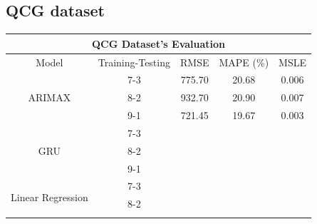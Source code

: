 \documentclass{ieeeojies}
\begin{document}
\subsection{QCG dataset} 

\begin{table}[H]
  \begin{tabular}{|ccccc|}
  \hline
  \multicolumn{5}{|c|}{\textbf{QCG Dataset's Evaluation}}                                                                                                                  \\ \hline
  \multicolumn{1}{|c|}{Model}                              & \multicolumn{1}{c|}{Training-Testing} & \multicolumn{1}{c|}{RMSE}    & \multicolumn{1}{c|}{MAPE (\%)} & MSLE  \\ \hline
  \multicolumn{1}{|c|}{\multirow{3}{*}{ARIMAX}}             & \multicolumn{1}{c|}{7-3}            & \multicolumn{1}{c|}{775.70}        & \multicolumn{1}{c|}{20.68}          &     0.006  \\ \cline{2-5} 
  \multicolumn{1}{|c|}{}                                   & \multicolumn{1}{c|}{8-2}        & \multicolumn{1}{c|}{932.70}        & \multicolumn{1}{c|}{20.90}          &    0.007  \\ \cline{2-5} 
  \multicolumn{1}{|c|}{}                                   & \multicolumn{1}{c|}{9-1}        & \multicolumn{1}{c|}{721.45}        & \multicolumn{1}{c|}{19.67}          &   0.003    \\ \hline
  \multicolumn{1}{|c|}{\multirow{3}{*}{GRU}}               & \multicolumn{1}{c|}{7-3}            & \multicolumn{1}{c|}{}        & \multicolumn{1}{c|}{}          &       \\ \cline{2-5} 
  \multicolumn{1}{|c|}{}                                   & \multicolumn{1}{c|}{8-2}        & \multicolumn{1}{c|}{}        & \multicolumn{1}{c|}{}          &       \\ \cline{2-5} 
  \multicolumn{1}{|c|}{}                                   & \multicolumn{1}{c|}{9-1}        & \multicolumn{1}{c|}{}        & \multicolumn{1}{c|}{}          &       \\ \hline
  \multicolumn{1}{|c|}{\multirow{3}{*}{Linear Regression}} & \multicolumn{1}{c|}{7-3}            & \multicolumn{1}{c|}{}        & \multicolumn{1}{c|}{}          &       \\ \cline{2-5} 
  \multicolumn{1}{|c|}{}                                   & \multicolumn{1}{c|}{8-2}        & \multicolumn{1}{c|}{}        & \multicolumn{1}{c|}{}          &       \\ \cline{2-5} 

\end{tabular}
\end{table}
\end{document}
